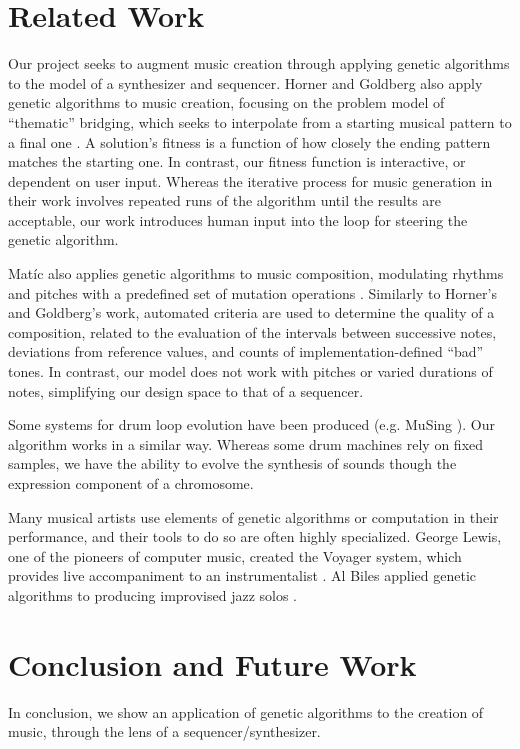 \documentclass[conference]{IEEEtran}
\begin{document}
\section{Related Work}

Our project seeks to augment music creation through applying genetic algorithms
to the model of a synthesizer and sequencer. Horner and Goldberg also apply
genetic algorithms to music creation, focusing on the problem model of
``thematic'' bridging, which seeks to interpolate from a starting musical
pattern to a final one \cite{horner}. A solution's fitness is a
function of how closely the ending pattern matches the starting one. In
contrast, our fitness function is interactive, or dependent on user input.
Whereas the iterative process for music generation in their work involves
repeated runs of the algorithm until the results are acceptable, our work
introduces human input into the loop for steering the genetic algorithm.

Matíc also applies genetic algorithms to music composition, modulating rhythms
and pitches with a predefined set of mutation operations
\cite{matic}. Similarly to Horner's and Goldberg's work, automated
criteria are used to determine the quality of a composition, related to the
evaluation of the intervals between successive notes, deviations from reference
values, and counts of implementation-defined ``bad'' tones. In contrast, our
model does not work with pitches or varied durations of notes, simplifying our
design space to that of a sequencer.

Some systems for drum loop evolution have been produced (e.g. MuSing
\cite{musing}). Our algorithm works in a similar way. Whereas some
drum machines rely on fixed samples, we have the ability to evolve the
synthesis of sounds though the expression component of a chromosome.

Many musical artists use elements of genetic algorithms or computation in their
performance, and their tools to do so are often highly specialized. George
Lewis, one of the pioneers of computer music, created the Voyager system, which
provides live accompaniment to an instrumentalist \cite{voyager}. Al
Biles applied genetic algorithms to producing improvised jazz solos
\cite{genjazz}.

\section{Conclusion and Future Work}

In conclusion, we show an application of genetic algorithms to the creation of
music, through the lens of a sequencer/synthesizer.
\end{document}
